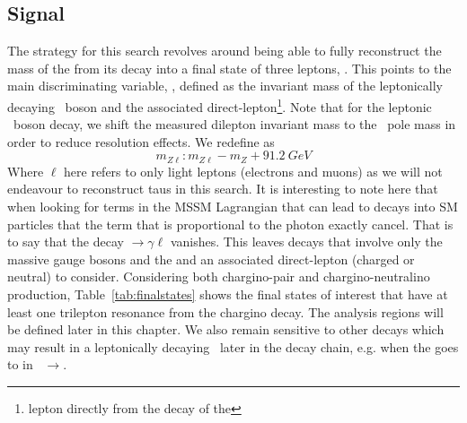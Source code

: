 \subsection{Signal}
\label{sec:strategy:signal}
The strategy for this search revolves around being able to fully reconstruct the mass of the \chone from its decay into a final state of three leptons, \triLepDecay.
This points to the main discriminating variable, \mZl, defined as the invariant mass of the leptonically decaying \Zboson\ boson and the associated direct-lepton\footnote{lepton directly from the decay of the \chono}.
Note that for the leptonic \Zboson\ boson decay, we shift the measured dilepton invariant mass to the \Zboson\ pole mass in order to reduce resolution effects.
We redefine \mZl as 
\begin{equation}
    m_{Z\ell} : m_{Z\ell} - m_{Z} + 91.2 ~GeV
    \label{eq:mzl}
\end{equation}
Where $\ell$ here refers to only light leptons (electrons and muons) as we will not endeavour to reconstruct taus in this search. 
It is interesting to note here that when looking for terms in the \BL MSSM Lagrangian that can lead to \chono decays into SM particles that the term that is proportional to the photon exactly cancel.
That is to say that the decay \chone$\rightarrow\gamma\ell$ vanishes.
This leaves decays that involve only the massive gauge bosons and the \Higgs and an associated direct-lepton (charged or neutral) to consider.
Considering both chargino-pair and chargino-neutralino production, Table~\ref{tab:finalstates} shows the final states of interest that have at least one trilepton resonance from the chargino decay.
The analysis regions will be defined later in this chapter.
We also remain sensitive to other decays which may result in a leptonically decaying \Zboson\ later in the decay chain, e.g. when the \Higgs goes to \ZZ in \CCsignal\ $\rightarrow$\Hl\Hl.





